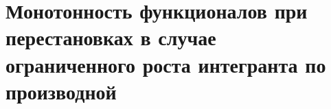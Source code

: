 \chapter{Монотонность функционалов при перестановках в случае ограниченного роста интегранта по производной}
\label{chapt1}






